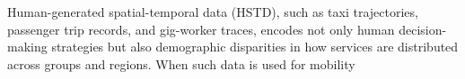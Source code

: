 Human-generated spatial-temporal data (HSTD), such as taxi trajectories,
passenger trip records, and gig-worker traces, encodes not only human
decision-making strategies but also demographic disparities in how services
are distributed across groups and regions. When such data is used for mobility
